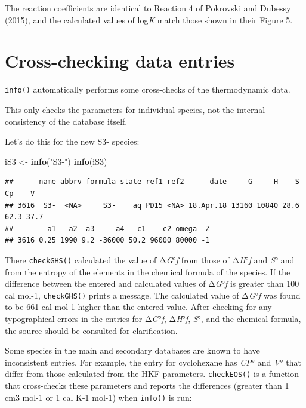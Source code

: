 \documentclass[]{tufte-book}
\newenvironment{Shaded}{}{}
\newcommand{\KeywordTok}[1]{\textcolor[rgb]{0.00,0.44,0.13}{\textbf{#1}}}
\newcommand{\StringTok}[1]{\textcolor[rgb]{0.25,0.44,0.63}{#1}}
\newcommand{\NormalTok}[1]{#1}
\begin{document}
The reaction coefficients are identical to Reaction 4 of Pokrovski and
Dubessy (2015), and the calculated values of log\emph{K} match those
shown in their Figure 5.

\section{Cross-checking data entries}\label{cross-checking-data-entries}

{\texttt{info()}} automatically performs some cross-checks of the
thermodynamic data.

\begin{marginfigure}
This only checks the parameters for individual species, not the internal
consistency of the database itself.
\end{marginfigure}

Let's do this for the new S3- species:

\begin{Shaded}
\begin{Highlighting}[]
\NormalTok{iS3 <-}\StringTok{ }\KeywordTok{info}\NormalTok{(}\StringTok{"S3-"}\NormalTok{)}
\KeywordTok{info}\NormalTok{(iS3)}
\end{Highlighting}
\end{Shaded}

\begin{verbatim}
##      name abbrv formula state ref1 ref2      date     G     H    S   Cp    V
## 3616  S3-  <NA>     S3-    aq PD15 <NA> 18.Apr.18 13160 10840 28.6 62.3 37.7
##        a1   a2  a3     a4   c1    c2 omega  Z
## 3616 0.25 1990 9.2 -36000 50.2 96000 80000 -1
\end{verbatim}

There {\texttt{checkGHS()}} calculated the value of Δ\emph{G}°\emph{f}
from those of Δ\emph{H}°\emph{f} and \emph{S}° and from the entropy of
the elements \citep{CWM89} in the chemical formula of the species. If
the difference between the entered and calculated values of
Δ\emph{G}°\emph{f} is greater than 100 cal mol-1, {\texttt{checkGHS()}}
prints a message. The calculated value of Δ\emph{G}°\emph{f} was found
to be 661 cal mol-1 higher than the entered value. After checking for
any typographical errors in the entries for Δ\emph{G}°\emph{f},
Δ\emph{H}°\emph{f}, \emph{S}°, and the chemical formula, the source
should be consulted for clarification.

Some species in the main and secondary databases are known to have
inconsistent entries. For example, the entry for cyclohexane has
\emph{C}\emph{P}° and \emph{V}° that differ from those calculated from
the HKF parameters. {\texttt{checkEOS()}} is a function that
cross-checks these parameters and reports the differences (greater than
1 cm3 mol-1 or 1 cal K-1 mol-1) when {\texttt{info()}} is run:
\end{document}
